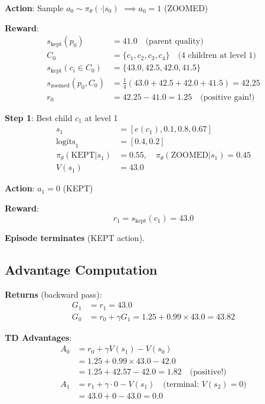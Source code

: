 \documentclass[11pt]{article}
\begin{document}
\textbf{Action}: Sample $a_0 \sim \pi_\theta(\cdot|s_0)$ $\implies a_0 = 1$ (ZOOMED)

\textbf{Reward}:
\begin{align}
s_{\text{kept}}(p_0) &= 41.0 \quad \text{(parent quality)} \\
C_0 &= \{c_1, c_2, c_3, c_4\} \quad \text{(4 children at level 1)} \\
s_{\text{kept}}(c_i\in C_0) &= \{43.0, 42.5, 42.0, 41.5\} \\
s_{\text{zoomed}}(p_0, C_0) &= \frac{1}{4}(43.0 + 42.5 + 42.0 + 41.5) = 42.25 \\
r_0 &= 42.25 - 41.0 = \boxed{1.25} \quad \text{(positive gain!)}
\end{align}

\textbf{Step 1}: Best child $c_1$ at level 1
\begin{align}
s_1 &= [e(c_1), 0.1, 0.8, 0.67] \\
\text{logits}_1 &= [0.4, 0.2] \\
\pi_\theta(\text{KEPT}|s_1) &= 0.55, \quad \pi_\theta(\text{ZOOMED}|s_1) = 0.45 \\
V(s_1) &= 43.0
\end{align}

\textbf{Action}: $a_1 = 0$ (KEPT)

\textbf{Reward}:
\begin{equation}
r_1 = s_{\text{kept}}(c_1) = \boxed{43.0}
\end{equation}

\textbf{Episode terminates} (KEPT action).

\subsection{Advantage Computation}

\textbf{Returns} (backward pass):
\begin{align}
G_1 &= r_1 = 43.0 \\
G_0 &= r_0 + \gamma G_1 = 1.25 + 0.99 \times 43.0 = 43.82
\end{align}

\textbf{TD Advantages}:
\begin{align}
A_0 &= r_0 + \gamma V(s_1) - V(s_0) \\
    &= 1.25 + 0.99 \times 43.0 - 42.0 \\
    &= 1.25 + 42.57 - 42.0 = \boxed{1.82} \quad \text{(positive!)} \\
A_1 &= r_1 + \gamma \cdot 0 - V(s_1) \quad \text{(terminal: } V(s_2) = 0) \\
    &= 43.0 + 0 - 43.0 = \boxed{0.0}
\end{align}
\end{document}
